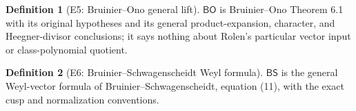 \documentclass[11pt,a4paper]{article}
\numberwithin{equation}{section}
\theoremstyle{plain}\newtheorem{theorem}{Theorem}[section]\newaliascnt{proposition}{theorem}\newtheorem{proposition}[proposition]{Proposition}\aliascntresetthe{proposition}\newaliascnt{lemma}{theorem}\newtheorem{lemma}[lemma]{Lemma}\aliascntresetthe{lemma}
\theoremstyle{definition}\newaliascnt{definition}{theorem}\newtheorem{definition}[definition]{Definition}\aliascntresetthe{definition}\newaliascnt{notation}{theorem}\newtheorem{notation}[notation]{Notation}\aliascntresetthe{notation}
\providecommand{\lean}[1]{}\providecommand{\leanok}{}
\begin{document}
\begin{definition}[E5: Bruinier--Ono general lift]\label{def_ext_borcherds}\lean{SptCM.RolenLiterature.E5BruinierOno}\leanok
$\mathsf{BO}$ is Bruinier--Ono Theorem 6.1 with its original hypotheses and its general product-expansion, character, and Heegner-divisor conclusions; it says nothing about Rolen's particular vector input or class-polynomial quotient.
\end{definition}
\begin{definition}[E6: Bruinier--Schwagenscheidt Weyl formula]\label{def_ext_weyl}\lean{SptCM.RolenLiterature.E6BruinierSchwagenscheidt}\leanok
$\mathsf{BS}$ is the general Weyl-vector formula of Bruinier--Schwagenscheidt, equation (11), with the exact cusp and normalization conventions.
\end{definition}
\end{document}

